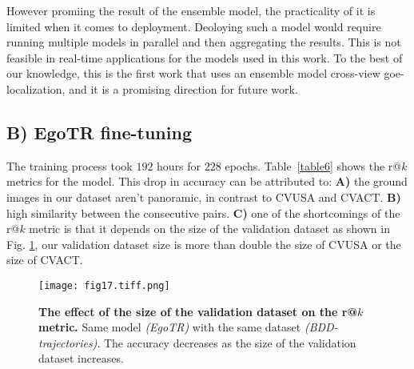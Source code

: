 \documentclass[10pt,letterpaper]{article}
\newif\ifhighlight
\newcommand{\hlb}[1]{\ifhighlight{\hl{#1}}\else{#1}\fi}
\begin{document}
\FloatBarrier
\hlb{However promiing the result of the ensemble model, the practicality of it is limited when it comes to deployment. Deoloying such a model would require running multiple models in parallel and then aggregating the results. This is not feasible in real-time applications for the models used in this work. To the best of our knowledge, this is the first work that uses an ensemble model cross-view goe-localization, and it is a promising direction for future work.}

\subsection*{B) EgoTR fine-tuning}

The training process took $192$ hours for $228$ epochs. Table~\ref{table6} shows the r@\hlb{$k$} metrics for the model. This drop in accuracy can be attributed to: {\bf A)} the ground images in our dataset aren't panoramic, in contrast to CVUSA and CVACT. {\bf B)} high similarity between the consecutive pairs. {\bf C)} one of the shortcomings of the r@\hlb{$k$} metric is that it depends on the size of the validation dataset as shown in \hlb{Fig.} \ref{fig17}, our validation dataset size is more than double the size of CVUSA or the size of CVACT.

\begin{table}[!ht]
  \centering
  \caption{
  {\bf r@\hlb{$k$} metrics of EgoTR fine-tuned over the reshaped BDD-trajectories dataset.}}
  \label{table6}
\end{table}

\begin{figure}[!ht]
  \caption{{\bf The effect of the size of the validation dataset on the r@\hlb{$k$} metric.}  Same model \emph{(EgoTR)} with the same dataset \emph{(BDD-trajectories)}. The accuracy decreases as the size of the validation dataset increases.}
  \texttt{[image: fig17.tiff.png]}
  \label{fig17}
\end{figure}

\FloatBarrier
\end{document}
